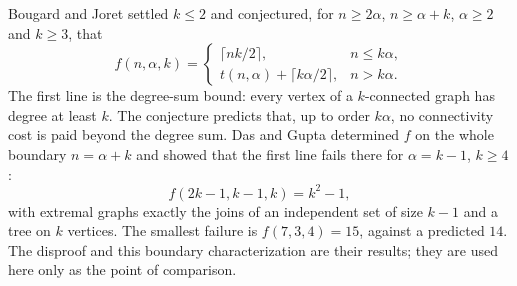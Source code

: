 \documentclass[11pt]{article}
\theoremstyle{remark}
\begin{document}
Bougard and Joret \cite{BJ} settled $k\le2$ and conjectured, for $n\ge2\alpha$, $n\ge\alpha+k$, $\alpha\ge2$ and $k\ge3$, that
\begin{equation}\label{eq:conj}
f(n,\alpha,k)=
\begin{cases}
\lceil nk/2\rceil,&n\le k\alpha,\\
t(n,\alpha)+\lceil k\alpha/2\rceil,&n>k\alpha.
\end{cases}
\end{equation}
The first line is the degree-sum bound: every vertex of a $k$-connected graph has degree at least $k$.
The conjecture predicts that, up to order $k\alpha$, no connectivity cost is paid beyond the degree sum.
Das and Gupta \cite{DG} determined $f$ on the whole boundary $n=\alpha+k$ and showed that the first line fails there for $\alpha=k-1$, $k\ge4$:
\begin{equation}\label{eq:old}
f(2k-1,k-1,k)=k^2-1,
\end{equation}
with extremal graphs exactly the joins of an independent set of size $k-1$ and a tree on $k$ vertices.
The smallest failure is $f(7,3,4)=15$, against a predicted $14$.
The disproof and this boundary characterization are their results; they are used here only as the point of comparison.
\end{document}
